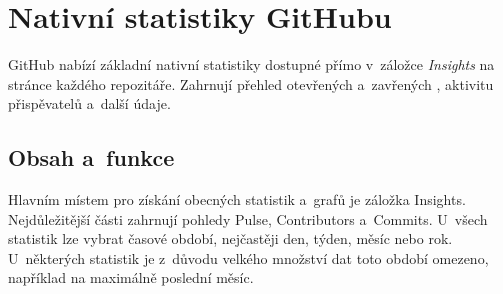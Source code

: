 




\section{Nativní statistiky GitHubu}
\label{sec:github_stats}

GitHub nabízí základní nativní statistiky dostupné přímo v~záložce \textit{Insights} na stránce každého repozitáře. Zahrnují přehled otevřených a~zavřených \PR, aktivitu přispěvatelů a~další údaje.

\subsection*{Obsah a~funkce}
\label{subsec:github_stats:content}

Hlavním místem pro získání obecných statistik a~grafů je záložka Insights. Nejdůležitější části zahrnují pohledy Pulse, Contributors a~Commits. U~všech statistik lze vybrat časové období, nejčastěji den, týden, měsíc nebo rok. U~některých statistik je z~důvodu velkého množství dat toto období omezeno, například na maximálně poslední měsíc.

